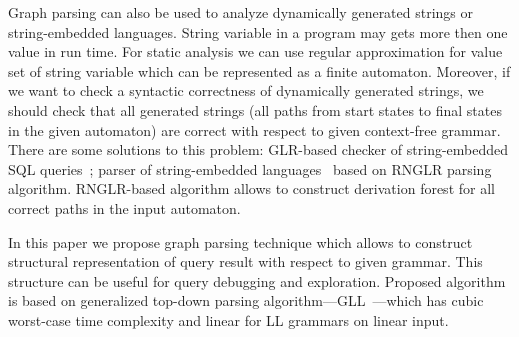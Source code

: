 \documentclass{sig-alternate} %
\begin{document}
Graph parsing can also be used to analyze dynamically generated strings or string-embedded languages. 
String variable in a program may gets more then one value in run time.
For static analysis we can use regular approximation for value set of string variable which can be represented as a finite automaton.
Moreover, if we want to check a syntactic correctness of dynamically generated strings, we should check that all generated strings (all paths from start states to final states in the given automaton) are correct with respect to given context-free grammar. 
There are some solutions to this problem: GLR-based checker of string-embedded SQL queries~\cite{Alvor1, Alvor2};
 parser of string-embedded languages~\cite{relaxedRNGLR} based on RNGLR parsing algorithm.
RNGLR-based algorithm allows to construct derivation forest for all correct paths in the input automaton.

In this paper we propose graph parsing technique which allows to construct structural representation of query result with respect to given grammar.
This structure can be useful for query debugging and exploration. 
Proposed algorithm is based on generalized top-down parsing algorithm---GLL~\cite{scott2010gll}---which has cubic worst-case time complexity and linear for LL grammars on linear input.  














\balancecolumns
\end{document}
